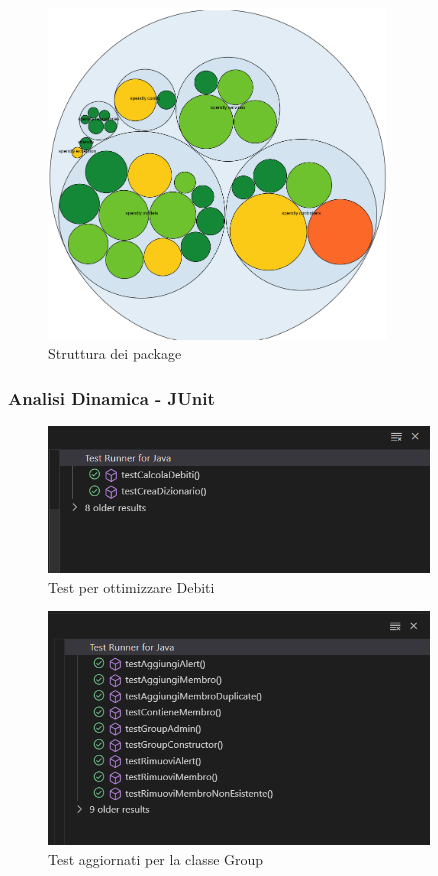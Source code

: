 \begin{figure}[H]
    \centering
    \includegraphics[width=0.8\textwidth]{images/Package_iter2.png}
    \caption{Struttura dei package}
    \label{fig:Package_iterazione2}
\end{figure}

\subsubsection{Analisi Dinamica - JUnit}

\begin{figure}[H]
    \centering
    \includegraphics[width=0.9\textwidth]{images/CalcolaDebitiTest.png}
    \caption{Test per ottimizzare Debiti}
    \label{fig:CalcolaDebitiTest}
\end{figure}

\begin{figure}[H]
    \centering
    \includegraphics[width=0.9\textwidth]{images/GroupTest_iter2.png}
    \caption{Test aggiornati per la classe Group}
    \label{fig:GroupTest_iter2}
\end{figure}

